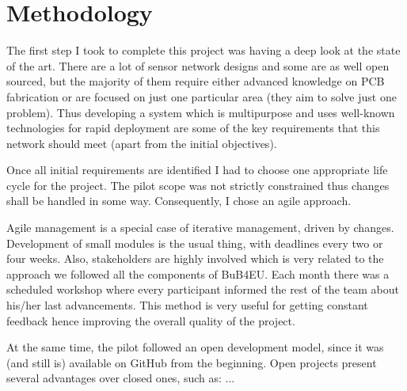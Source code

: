 
\chapter{Methodology} %

\label{Chapter4} %



The first step I took to complete this project was having a deep look at the state of the art. There are a lot of sensor network designs and some are as well open sourced, but the majority of them require either advanced knowledge on PCB fabrication or are focused on just one particular area (they aim to solve just one problem). Thus developing a system which is multipurpose and uses well-known technologies for rapid deployment are some of the key requirements that this network should meet (apart from the initial objectives).

Once all initial requirements are identified I had to choose one appropriate life cycle for the project. The pilot scope was not strictly constrained thus changes shall be handled in some way. Consequently, I chose an agile\citep{} approach.

Agile management is a special case of iterative management, driven by changes\citep{pmbok_agile}. Development of small modules is the usual thing, with deadlines every two or four weeks. Also, stakeholders are highly involved which is very related to the approach we followed all the components of BuB4EU. Each month there was a scheduled workshop where every participant informed the rest of the team about his/her last advancements. This method is very useful for getting constant feedback hence improving the overall quality of the project.

At the same time, the pilot followed an open development model, since it was (and still is) available on GitHub from the beginning. Open projects present several advantages over closed ones\citep{}, such as: ...
